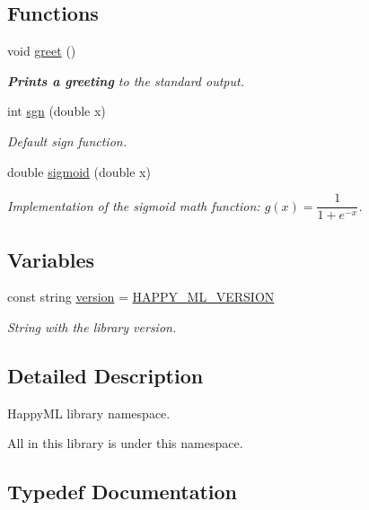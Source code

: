 \subsection*{Functions}
\begin{DoxyCompactItemize}
\item 
void \hyperlink{namespacehappyml_a09117cf6d4536b9931eeb99b0e207816}{greet} ()
\begin{DoxyCompactList}\small\item\em {\bfseries Prints a greeting} to the standard output. \end{DoxyCompactList}\item 
int \hyperlink{namespacehappyml_a818943383c6c3f2e59125202b8d342cb}{sgn} (double x)
\begin{DoxyCompactList}\small\item\em Default sign function. \end{DoxyCompactList}\item 
double \hyperlink{namespacehappyml_a5a6cbad2806ffd26f47906b289d3a3b6}{sigmoid} (double x)
\begin{DoxyCompactList}\small\item\em Implementation of the sigmoid math function\+: $ g(x) = \dfrac{1}{1 + e^{-x}} $. \end{DoxyCompactList}\end{DoxyCompactItemize}
\subsection*{Variables}
\begin{DoxyCompactItemize}
\item 
const string \hyperlink{namespacehappyml_a029cc82b46dcfc6fa48ab5c5e23e5393}{version} = \hyperlink{happyml_8h_a698bf5b8376fff577101c5f66a8ce1c3}{H\+A\+P\+P\+Y\+\_\+\+M\+L\+\_\+\+V\+E\+R\+S\+I\+ON}
\begin{DoxyCompactList}\small\item\em String with the library version. \end{DoxyCompactList}\end{DoxyCompactItemize}


\subsection{Detailed Description}
Happy\+ML library namespace. 

All in this library is under this namespace. 

\subsection{Typedef Documentation}
